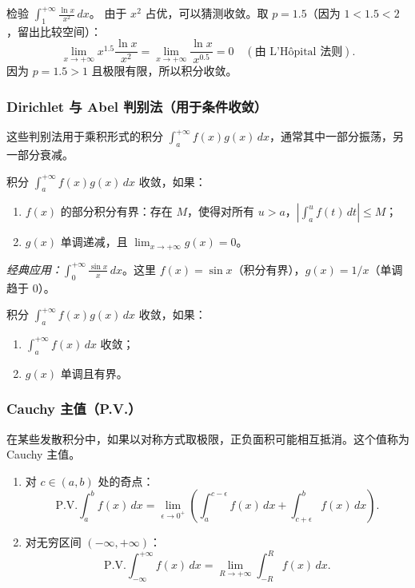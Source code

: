 \begin{example}
检验 $\int_1^{+\infty}\frac{\ln x}{x^2}\,dx$。
由于 $x^2$ 占优，可以猜测收敛。取 $p=1.5$（因为 $1<1.5<2$，留出比较空间）：
\[
\lim_{x\to +\infty}x^{1.5}\frac{\ln x}{x^2}=\lim_{x\to +\infty}\frac{\ln x}{x^{0.5}}=0\quad (\text{由 L'Hôpital 法则}).
\]
因为 $p=1.5>1$ 且极限有限，所以积分收敛。
\end{example}

\subsubsection{Dirichlet 与 Abel 判别法（用于条件收敛）}
这些判别法用于乘积形式的积分 $\int_a^{+\infty}f(x)g(x)\,dx$，通常其中一部分振荡，另一部分衰减。

\begin{theorem}
积分 $\int_a^{+\infty}f(x)g(x)\,dx$ 收敛，如果：
\begin{enumerate}
    \item $f(x)$ 的部分积分有界：存在 $M$，使得对所有 $u>a$，$|\int_a^u f(t)\,dt|\le M$；
    \item $g(x)$ 单调递减，且 $\lim_{x\to +\infty}g(x)=0$。
\end{enumerate}
\end{theorem}
\textit{经典应用：}$\int_0^{+\infty}\frac{\sin x}{x}\,dx$。这里 $f(x)=\sin x$（积分有界），$g(x)=1/x$（单调趋于 $0$）。

\begin{theorem}
积分 $\int_a^{+\infty}f(x)g(x)\,dx$ 收敛，如果：
\begin{enumerate}
    \item $\int_a^{+\infty}f(x)\,dx$ 收敛；
    \item $g(x)$ 单调且有界。
\end{enumerate}
\end{theorem}

\subsubsection{Cauchy 主值（P.V.）}

在某些发散积分中，如果以对称方式取极限，正负面积可能相互抵消。这个值称为 Cauchy 主值。

\begin{definition}
\begin{enumerate}
    \item 对 $c\in(a,b)$ 处的奇点：
    \[
    \text{P.V.}\int_a^b f(x)\,dx=\lim_{\epsilon\to 0^+}\left(\int_a^{c-\epsilon}f(x)\,dx+\int_{c+\epsilon}^{b}f(x)\,dx\right).
    \]
    \item 对无穷区间 $(-\infty,+\infty)$：
    \[
    \text{P.V.}\int_{-\infty}^{+\infty}f(x)\,dx=\lim_{R\to +\infty}\int_{-R}^{R}f(x)\,dx.
    \]
\end{enumerate}
\end{definition}


